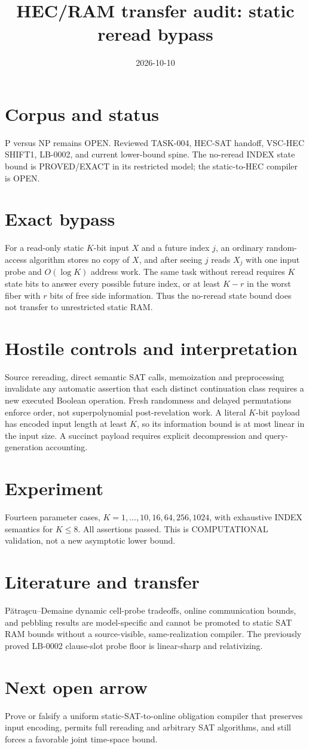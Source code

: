 \documentclass{article}
\begin{document}
\title{HEC/RAM transfer audit: static reread bypass}
\date{2026-10-10}
\maketitle
\section*{Corpus and status}
P versus NP remains OPEN. Reviewed TASK-004, HEC-SAT handoff,
VSC-HEC SHIFT1, LB-0002, and current lower-bound spine.
The no-reread INDEX state bound is PROVED/EXACT in its restricted model;
the static-to-HEC compiler is OPEN.
\section*{Exact bypass}
For a read-only static $K$-bit input $X$ and a future index $j$,
an ordinary random-access algorithm stores no copy of $X$,
and after seeing $j$ reads $X_j$ with one input probe and
$O(\log K)$ address work. The same task without reread
requires $K$ state bits to answer every possible future index,
or at least $K-r$ in the worst fiber with $r$ bits of free side information.
Thus the no-reread state bound does not transfer to unrestricted static RAM.
\section*{Hostile controls and interpretation}
Source rereading, direct semantic SAT calls, memoization and
preprocessing invalidate any automatic assertion that each distinct
continuation class requires a new executed Boolean operation.
Fresh randomness and delayed permutations enforce order, not
superpolynomial post-revelation work. A literal $K$-bit payload has
encoded input length at least $K$, so its information bound is at most
linear in the input size. A succinct payload requires explicit
decompression and query-generation accounting.
\section*{Experiment}
Fourteen parameter cases, $K=1,\ldots,10,16,64,256,1024$,
with exhaustive INDEX semantics for $K\le8$.
All assertions passed. This is COMPUTATIONAL validation, not a
new asymptotic lower bound.
\section*{Literature and transfer}
Pătraşcu--Demaine dynamic cell-probe tradeoffs, online
communication bounds, and pebbling results are model-specific
and cannot be promoted to static SAT RAM bounds without a
source-visible, same-realization compiler. The previously proved
LB-0002 clause-slot probe floor is linear-sharp and relativizing.
\section*{Next open arrow}
Prove or falsify a uniform static-SAT-to-online obligation compiler
that preserves input encoding, permits full rereading and arbitrary
SAT algorithms, and still forces a favorable joint time-space bound.
\end{document}
